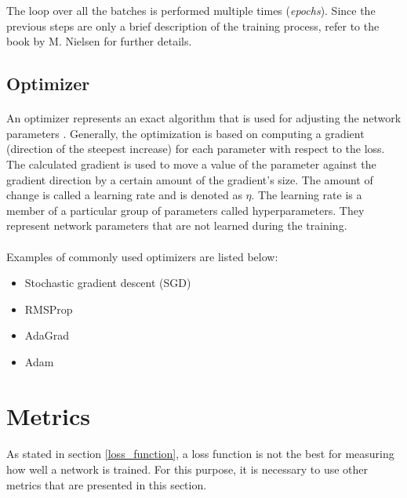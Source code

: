 The loop over all the batches is performed multiple times (\textit{epochs}). Since the previous steps are only a brief description of the training process, refer to the book by M. Nielsen \cite{Nielsen} for further details.

\subsection{Optimizer}\label{optimizers}
\paragraph{}
An optimizer represents an exact algorithm that is used for adjusting the network parameters \cite{deep_learning_with_python}. Generally, the optimization is based on computing a gradient (direction of the steepest increase) for each parameter with respect to the loss. The calculated gradient is used to move a value of the parameter against the gradient direction by a certain amount of the gradient's size. The amount of change is called a learning rate and is denoted as $\eta$. The learning rate is a member of a particular  group of parameters called hyperparameters. They represent network parameters that are not learned during the training.

\paragraph{}
Examples of commonly used optimizers are listed below:

\begin{itemize}
	\item Stochastic gradient descent (SGD) \cite{sgd}
	\item RMSProp \cite{RMSprop}
	\item AdaGrad \cite{adagrad_paper}
	\item Adam \cite{Adam_paper}
\end{itemize}

\section{Metrics}\label{metrics}
\paragraph{}
As stated in section \ref{loss_function}, a loss function is not the best for measuring how well a network is trained. For this purpose, it is necessary to use other metrics that are presented in this section.

